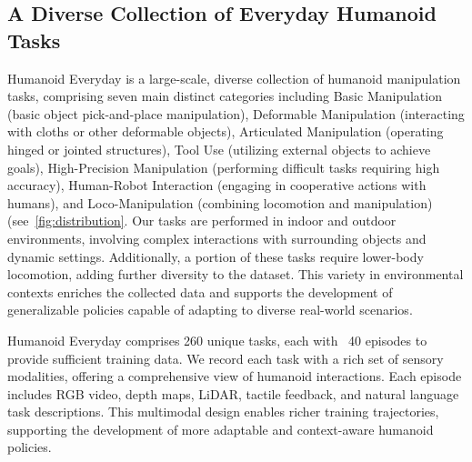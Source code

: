 \documentclass[letterpaper, 10pt, conference]{ieeeconf}
\begin{document}


\subsection{A Diverse Collection of Everyday Humanoid Tasks} \label{subsec:dataset}
Humanoid Everyday is a large-scale, diverse collection of humanoid manipulation tasks, comprising seven main distinct categories including Basic Manipulation (basic object pick-and-place manipulation), Deformable Manipulation (interacting with cloths or other deformable objects), Articulated Manipulation (operating hinged or jointed structures), Tool Use (utilizing external objects to achieve goals), High-Precision Manipulation (performing difficult tasks requiring high accuracy), Human-Robot Interaction (engaging in cooperative actions with humans), and Loco-Manipulation (combining locomotion and manipulation) (see~\autoref{fig:distribution}. Our tasks are performed in indoor and outdoor environments, involving complex interactions with surrounding objects and dynamic settings. Additionally, a portion of these tasks require lower-body locomotion, adding further diversity to the dataset. This variety in environmental contexts enriches the collected data and supports the development of generalizable policies capable of adapting to diverse real-world scenarios.\par




Humanoid Everyday comprises 260 unique tasks, each with ~40 episodes to provide sufficient training data. We record each task with a rich set of sensory modalities, offering a comprehensive view of humanoid interactions. Each episode includes RGB video, depth maps, LiDAR, tactile feedback, and natural language task descriptions. This multimodal design enables richer training trajectories, supporting the development of more adaptable and context-aware humanoid policies.\par
\end{document}
